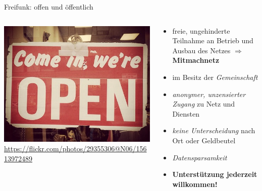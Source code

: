 \documentclass[10pt]{beamer}
\begin{document}
    \begin{frame}{Freifunk: offen und öffentlich}
      \begin{columns}[c]
        \begin{column}{5cm}
          \includegraphics[width=\textwidth]{images/open}
          \newline \tiny \url{https://flickr.com/photos/29355306@N06/15613972489}
        \end{column}
        \begin{column}{7cm}
          \begin{itemize}
            \item freie, ungehinderte Teilnahme an Betrieb und Ausbau des Netzes $\Rightarrow$ \textbf{Mitmachnetz}
            \item im Besitz der \textit{Gemeinschaft}
            \item \textit{anonymer, unzensierter Zugang} zu Netz und Diensten
            \item \textit{keine Unterscheidung} nach Ort oder Geldbeutel
            \item \textit{Datensparsamkeit}
            \item \textbf{Unterstützung jederzeit willkommen!}
          \end{itemize}
        \end{column}
      \end{columns}
    \end{frame}
\end{document}

